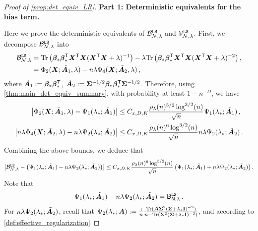 \begin{proof}[Proof of \cref{prop:det_equiv_LR}] 
{\bf Part 1: Deterministic equivalents for the bias term.}

Here we prove the deterministic equivalents of $\mathcal{B}_{\mathcal{N},\lambda}^{\tt LS}$ and $\mathcal{V}_{\mathcal{N},\lambda}^{\tt LS}$. First, we decompose $\mathcal{B}_{\mathcal{N},\lambda}^{\tt LS}$ into
\[
\begin{aligned}
    \mathcal{B}_{\mathcal{N},\lambda}^{\tt LS} &= {\rm Tr}\left({\boldsymbol \beta}_*{\boldsymbol \beta}_*^{\mathsf T}{\boldsymbol X}^{\mathsf T} {\boldsymbol X} ({\boldsymbol X}^{\mathsf T} {\boldsymbol X} + \lambda)^{-1}\right) - \lambda{\rm Tr}\left({\boldsymbol \beta}_*{\boldsymbol \beta}_*^{\mathsf T}{\boldsymbol X}^{\mathsf T} {\boldsymbol X} ({\boldsymbol X}^{\mathsf T} {\boldsymbol X} + \lambda)^{-2}\right),\\
    &= \Phi_2({\boldsymbol X}; \tilde{{\boldsymbol A}}_1, \lambda) - n\lambda \Phi_4({\boldsymbol X}; \tilde{{\boldsymbol A}}_2, \lambda)\,,
\end{aligned}
\]
where $\tilde{{\boldsymbol A}}_1 := {\boldsymbol \beta}_*{\boldsymbol \beta}_*^{\mathsf T}$, $\tilde{{\boldsymbol A}}_2 := {\boldsymbol \Sigma}^{-1/2}{\boldsymbol \beta}_*{\boldsymbol \beta}_*^{\mathsf T}{\boldsymbol \Sigma}^{-1/2}$. 
Therefore, using \cref{thm:main_det_equiv_summary}, with probability at least $1-n^{-D}$, we have
\[
\begin{aligned}
    \left|\Phi_2({\boldsymbol X}; \tilde{{\boldsymbol A}}_1, \lambda) - \Psi_1(\lambda_*; \tilde{{\boldsymbol A}}_1)\right| &\leq C_{x, D, K} \frac{\rho_{\lambda}(n)^{5/2} \log^{3/2}(n)}{\sqrt{n}} \Psi_1(\lambda_*; \tilde{{\boldsymbol A}}_1)\,,\\
    \left|n\lambda\Phi_4({\boldsymbol X}; \tilde{{\boldsymbol A}}_2, \lambda) - n\lambda\Psi_2(\lambda_*; \tilde{{\boldsymbol A}}_2)\right| &\leq C_{x, D, K} \frac{\rho_{\lambda}(n)^6 \log^{3/2}(n)}{\sqrt{n}} n\lambda\Psi_2(\lambda_*; \tilde{{\boldsymbol A}}_2)\,.
\end{aligned}
\]
Combining the above bounds, we deduce that
\[
\begin{aligned}
    \left|\mathcal{B}_{\mathcal{N},\lambda}^{\tt LS} - \left(\Psi_1(\lambda_*; \tilde{{\boldsymbol A}}_1) - n\lambda\Psi_2(\lambda_*; \tilde{{\boldsymbol A}}_2)\right)\right| \leq C_{x, D, K} \frac{\rho_{\lambda}(n)^6 \log^{3/2}(n)}{\sqrt{n}}\left(\Psi_1(\lambda_*; \tilde{{\boldsymbol A}}_1)+n\lambda\Psi_2(\lambda_*; \tilde{{\boldsymbol A}}_2)\right).
\end{aligned}
\]
Note that
\[
\begin{aligned}
    \Psi_1(\lambda_*; \tilde{{\boldsymbol A}}_1) - n\lambda\Psi_2(\lambda_*; \tilde{{\boldsymbol A}}_2) = \mathsf B_{\mathsf N,\lambda}^{\tt LS}\,.    
\end{aligned}
\]
For $n\lambda\Psi_2(\lambda_*; \tilde{{\boldsymbol A}}_2)$, recall that $\Psi_2(\lambda_*; {\boldsymbol A}) := \frac{1}{n} \frac{{\rm Tr}({\boldsymbol A} {\boldsymbol \Sigma}^2 ({\boldsymbol \Sigma} + \lambda_*{\mathbf I})^{-2})}{n - {\rm Tr}({\boldsymbol \Sigma}^2 ({\boldsymbol \Sigma} + \lambda_*{\mathbf I})^{-2})}$, and according to \cref{def:effective_regularization} 

\end{proof}
